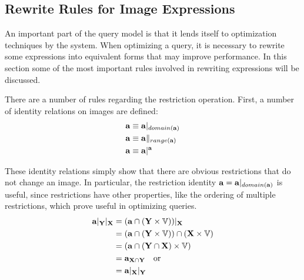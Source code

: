 \documentclass{ucdthesis}       %
\begin{document}
\subsection{Rewrite Rules for Image Expressions}
\label{sec:rewrites}

An important part of the query model is that it lends itself to
optimization techniques by the system.  When optimizing a query, it is
necessary to rewrite some expressions into equivalent forms that may
improve performance.  In this section some of the most important
rules involved in rewriting expressions will be discussed.


There are a number of rules regarding the restriction operation.
First, a number of identity relations on images are defined:
\begin{align*}
  {\ensuremath{\bf{a}}} &\equiv {\ensuremath{\bf{a}}}|_{domain({\bf{a}})}  \\
  {\bf{a}} &\equiv {\ensuremath{\bf{a}}}\|_{range({\bf{a}})} \\
  {\bf{a}} &\equiv {\ensuremath{\bf{a}}}|^{{\bf{a}}}
\end{align*}

These identity relations simply show that there are obvious
restrictions that do not change an image.  In particular, the
restriction identity ${\bf{a}} = {\bf{a}}|_{domain({\bf{a}})}$ is useful,
since restrictions have other properties, like the ordering of
multiple restrictions, which prove useful in optimizing queries.
\begin{align*}
{\ensuremath{\bf{a}}}|_{\bf{Y}}|_{\bf{X}}&=({\bf{a}} \cap ({\bf{Y}} \times {\ensuremath{\mathbb{V}}}))|_{\bf{X}} \\
&=({\bf{a}} \cap ({\bf{Y}} \times {\ensuremath{\mathbb{V}}})) \cap ({\bf{X}} \times {\ensuremath{\mathbb{V}}}) \\
&=({\bf{a}} \cap ({\bf{Y}}\cap{\ensuremath{\bf{X}}}) \times {\ensuremath{\mathbb{V}}}) \\
&={\bf{a}}_{{\bf{X}}\cap{\ensuremath{\bf{Y}}}} \quad \text{or} \\
&={\bf{a}}|_{\bf{X}}|_{\bf{Y}}
\end{align*}
\end{document}
